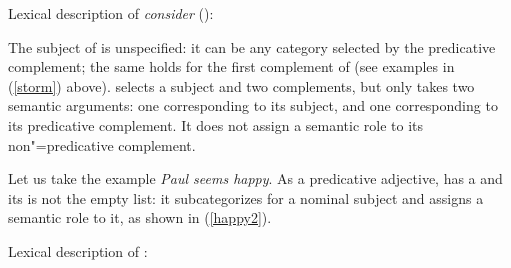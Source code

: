 \eas
Lexical description of \emph{consider} ():\\
\zs

	
The subject of  is unspecified: it can be any category selected by the predicative
complement; the same holds for the first complement of 
(see examples in (\ref{storm}) above).   selects
a subject and two complements, but only takes two semantic arguments: one corresponding to its
subject, and one corresponding to its predicative complement. It does not assign a semantic role to
its non"=predicative complement.

Let us take the example \textit{Paul seems happy}. As a predicative adjective,  has a
\headf [\prd $+$] and its \subjf is not the empty list: it subcategorizes for a nominal subject and
assigns a semantic role to it, as shown in (\ref{happy2}).
	
\eas
\label{happy2}%
Lexical description of :\\
\zs

